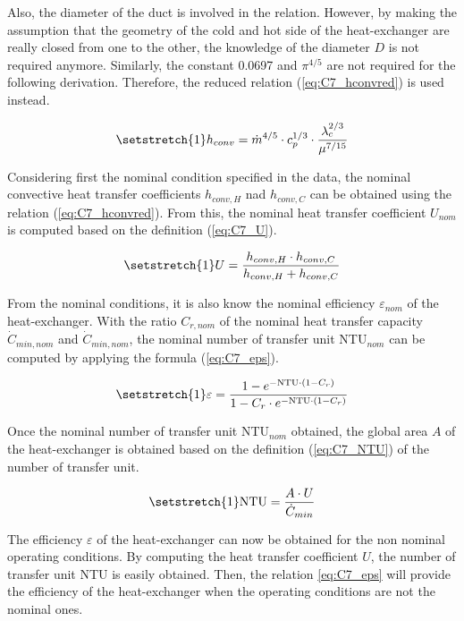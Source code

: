 Also, the diameter of the duct is involved in the relation. However, by making the assumption that the geometry of the cold and hot side of the heat-exchanger are really closed from one to the other, the knowledge of the diameter $D$ is not required anymore. Similarly, the constant 0.0697 and $\pi^{4/5}$ are not required for the following derivation. Therefore, the reduced relation (\ref{eq:C7_hconvred}) is used instead.

\begin{equation}
    \setstretch{1}
    h_{conv} = \dot{m}^{4/5}\cdot c_p^{1/3}\cdot \frac{\lambda_c^{2/3}}{\mu^{7/15}}\label{eq:C7_hconvred}
\end{equation}

Considering first the nominal condition specified in the data, the nominal convective heat transfer coefficients $h_{conv,H}$ nad $h_{conv,C}$ can be obtained using the relation (\ref{eq:C7_hconvred}). From this, the nominal heat transfer coefficient $U_{nom}$ is computed based on the definition (\ref{eq:C7_U}).

\begin{equation}
    \setstretch{1}
    U = \frac{h_{conv,H}\cdot h_{conv,C}}{h_{conv,H} + h_{conv,C}}\label{eq:C7_U}
\end{equation}

From the nominal conditions, it is also know the nominal efficiency $\varepsilon_{nom}$ of the heat-exchanger. With the ratio $C_{r,nom}$ of the nominal heat transfer capacity $\dot{C}_{min,nom}$ and $\dot{C}_{min,nom}$, the nominal number of transfer unit NTU$_{nom}$ can be computed by applying the formula (\ref{eq:C7_eps}).

\begin{align}
    \setstretch{1}
    \varepsilon = \frac{1 - e^{-\text{NTU}\cdot (1 - C_r)}}{1 - C_r\cdot e^{-\text{NTU}\cdot (1 - C_r)}}\label{eq:C7_eps}
\end{align}

Once the nominal number of transfer unit NTU$_{nom}$ obtained, the global area $A$ of the heat-exchanger is obtained based on the definition (\ref{eq:C7_NTU}) of the number of transfer unit.

\begin{equation}
    \setstretch{1}
    \text{NTU} = \frac{A\cdot U}{\dot{C}_{min}} \label{eq:C7_NTU}
\end{equation}

The efficiency $\varepsilon$ of the heat-exchanger can now be obtained for the non nominal operating conditions. By computing the heat transfer coefficient $U$, the number of transfer unit NTU is easily obtained. Then, the relation \ref{eq:C7_eps} will provide the efficiency of the heat-exchanger when the operating conditions are not the nominal ones.

